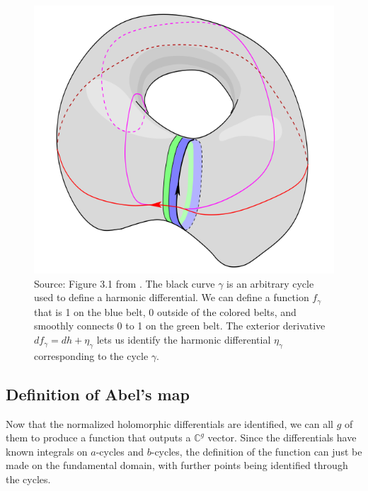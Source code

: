 \begin{figure}
    \center
    \includegraphics{assets/HarmonicDifferential.png}
    \caption{Source: Figure 3.1 from \cite{Ber06}.
    The black curve $\gamma$ is an arbitrary cycle used to define a harmonic differential. We can define a function $f_\gamma$ that is 1 on the blue belt, 0 outside of the colored belts, and smoothly connects 0 to 1 on the green belt. The exterior derivative $df_\gamma=dh+\eta_\gamma$ lets us identify the harmonic differential $\eta_\gamma$ corresponding to the cycle $\gamma$.}
    \label{figB12:Harmonic}
\end{figure}

\subsection{Definition of Abel's map}

Now that the normalized holomorphic differentials are identified, we can all $g$ of them to produce a function that outputs a $\mathbb C^g$ vector. Since the differentials have known integrals on $a$-cycles and $b$-cycles, the definition of the function can just be made on the fundamental domain, with further points being identified through the cycles.

